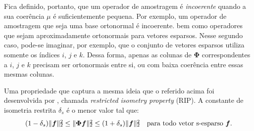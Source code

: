 \documentclass[cic,tc]{iiufrgs}
\def\SPSB#1#2{\rlap{\textsuperscript{#1}}\SB{#2}}
\def\SB#1{\textsubscript{#1}}
\renewcommand{\vec}[1]{\bm{#1}}
\newcommand{\mat}[1]{\bm{#1}}
\begin{document}
Fica definido, portanto, que um operador de amostragem é \textit{incoerente} quando a sua coerência $\mu$ é 
suficientemente pequena. Por exemplo, um operador de amostragem que seja uma base ortonormal é incoerente.
bem como operadores que sejam aproximadamente ortonormais para vetores esparsos.
Nesse segundo caso, pode-se imaginar, por exemplo, que o conjunto de vetores esparsos utiliza 
somente os índices $i$, $j$ e $k$.
Dessa forma, apenas as colunas de $\mat{\Phi}$ correspondentes a $i$, $j$ e $k$ precisam ser 
ortonormais entre si, ou com baixa coerência entre essas mesmas colunas.

Uma propriedade que captura a mesma ideia que o referido acima foi desenvolvida por \citet{CandesSignalRecovery}, chamada 
\textit{restricted isometry property} (RIP). A constante de isometria restrita 
$\delta_s$ é o menor valor tal que:
\begin{equation}
    \label{eq:rip}
    (1 - \delta_s)\lVert \vec{f} \rVert\SPSB{2}{2} \le \lVert \mathbf{\Phi} \vec{f} \rVert \SPSB{2}{2} \le 
    (1 + \delta_s)\lVert \vec{f} \rVert\SPSB{2}{2} \hspace{1em} \text{para todo vetor s-esparso } \vec{f}.
\end{equation}
\end{document}
